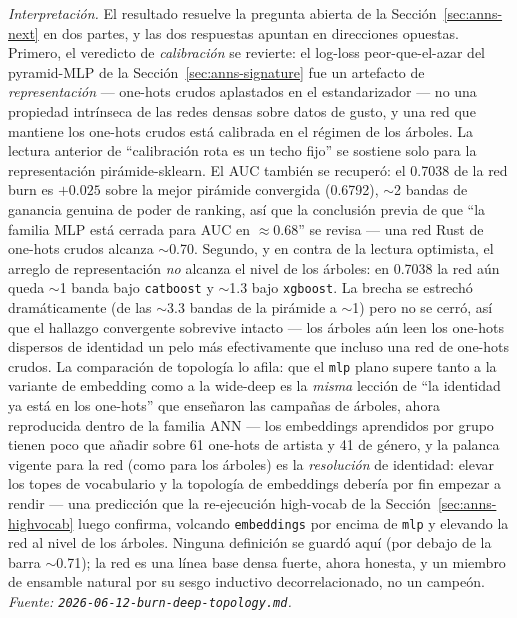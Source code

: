 \documentclass[11pt]{article}
\begin{document}
\emph{Interpretación.} El resultado resuelve la pregunta abierta de la
Sección~\ref{sec:anns-next} en dos partes, y las dos respuestas apuntan en
direcciones opuestas. Primero, el veredicto de \emph{calibración} se revierte: el
log-loss peor-que-el-azar del pyramid-MLP de la Sección~\ref{sec:anns-signature}
fue un artefacto de \emph{representación} --- one-hots crudos aplastados en el
estandarizador --- no una propiedad intrínseca de las redes densas sobre datos de
gusto, y una red que mantiene los one-hots crudos está calibrada en el régimen de
los árboles. La lectura anterior de ``calibración rota es un techo fijo'' se
sostiene solo para la representación pirámide-sklearn. El AUC también se recuperó:
el \num{0.7038} de la red burn es $+0.025$ sobre la mejor pirámide convergida
(\num{0.6792}), $\sim$2 bandas de ganancia genuina de poder de ranking, así que la
conclusión previa de que ``la familia MLP está cerrada para AUC en $\approx
0.68$'' se revisa --- una red Rust de one-hots crudos alcanza $\sim$0.70. Segundo,
y en contra de la lectura optimista, el arreglo de representación \emph{no} alcanza
el nivel de los árboles: en \num{0.7038} la red aún queda $\sim$1 banda bajo
\texttt{catboost} y $\sim$1.3 bajo \texttt{xgboost}. La brecha se estrechó
dramáticamente (de las $\sim$3.3 bandas de la pirámide a $\sim$1) pero no se
cerró, así que el hallazgo convergente sobrevive intacto --- los árboles aún leen
los one-hots dispersos de identidad un pelo más efectivamente que incluso una red
de one-hots crudos. La comparación de topología lo afila: que el \texttt{mlp}
plano supere tanto a la variante de embedding como a la wide-deep es la
\emph{misma} lección de ``la identidad ya está en los one-hots'' que enseñaron las
campañas de árboles, ahora reproducida dentro de la familia ANN --- los embeddings
aprendidos por grupo tienen poco que añadir sobre 61 one-hots de artista y 41 de
género, y la palanca vigente para la red (como para los árboles) es la
\emph{resolución} de identidad: elevar los topes de vocabulario y la topología de
embeddings debería por fin empezar a rendir --- una predicción que la
re-ejecución high-vocab de la Sección~\ref{sec:anns-highvocab} luego confirma,
volcando \texttt{embeddings} por encima de \texttt{mlp} y elevando la red al nivel
de los árboles. Ninguna definición se guardó aquí (por debajo de la barra
$\sim$0.71); la red es una línea base densa fuerte, ahora honesta, y un miembro de
ensamble natural por su sesgo inductivo decorrelacionado, no un campeón.
\emph{Fuente: \texttt{2026-06-12-burn-deep-topology.md}.}
\end{document}
